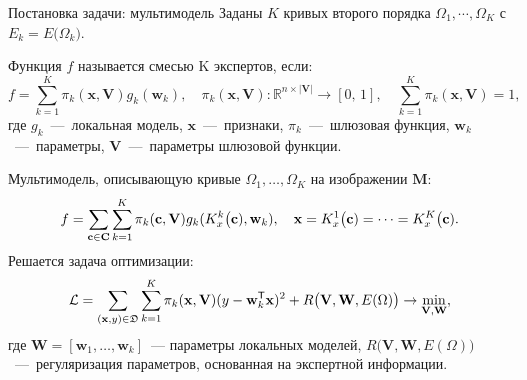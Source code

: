 \documentclass[10pt,pdf,hyperref={unicode}]{beamer}
\begin{document}
\begin{frame}{Постановка задачи: мультимодель}
\justifying
Заданы $K$ кривых второго порядка $\Omega_1, \cdots, \Omega_K$ с $E_k = E\bigr(\Omega_k\bigr)$.

\begin{definition}
Функция $f$ называется смесью K экспертов, если:
\[
	f = \sum\limits_{k = 1}^{K}\pi_k(\mathbf{x}, \mathbf{V})g_k(\mathbf{w}_k),  \quad \pi_k(\mathbf{x}, \mathbf{V}): \mathbb{R}^{n\times |\mathbf{V}|} \rightarrow [0, \, 1], \quad \sum\limits_{k = 1}^{K}\pi_k(\mathbf{x}, \mathbf{V}) = 1, 
\]
где $g_k$~---~локальная модель, $\mathbf{x}$~---~признаки, $\pi_k$~---~шлюзовая функция, $\mathbf{w}_k$~---~параметры, $\mathbf{V}$~---~параметры шлюзовой функции.
\end{definition}

Мультимодель, описывающую кривые $\Omega_1, \dots, \Omega_K$ на изображении $\mathbf{M}$:
\[
\setlength\abovedisplayskip{0pt}
	f = \sum\limits_{\mathbf{c} \in \mathbf{C}} \sum_{k = 1}^{K} \pi_k(\mathbf{c}, \mathbf{V})g_k(K^k_{x}\bigl(\mathbf{c}), \mathbf{w}_k), \quad \mathbf{x}=K^1_{x}\bigl(\mathbf{c})=\cdots=K^K_{x}\bigl(\mathbf{c}).
\setlength\belowdisplayskip{0pt}
\]
Решается задача оптимизации:
\[
\setlength\abovedisplayskip{0pt}
\mathcal{L} = \sum\limits_{(\mathbf{x}, y) \in \mathfrak{D}} \sum\limits_{k = 1}^{K} \pi_k(\mathbf{x}, \mathbf{V})(y - \mathbf{w}_k^{\mathsf{T}}\mathbf{x})^2 + R\bigl(\mathbf{V}, \mathbf{W}, E(\Omega)\bigr) \rightarrow \min_{\mathbf{V}, \mathbf{W}},
\setlength\belowdisplayskip{0pt}
\]
где $\mathbf{W} = [\mathbf{w}_1, \dots, \mathbf{w}_k]$~--- параметры локальных моделей, $R\bigl(\mathbf{V}, \mathbf{W}, E(\Omega)\bigr)$~---~регуляризация параметров, основанная на экспертной информации.

\end{frame}

\end{document}
